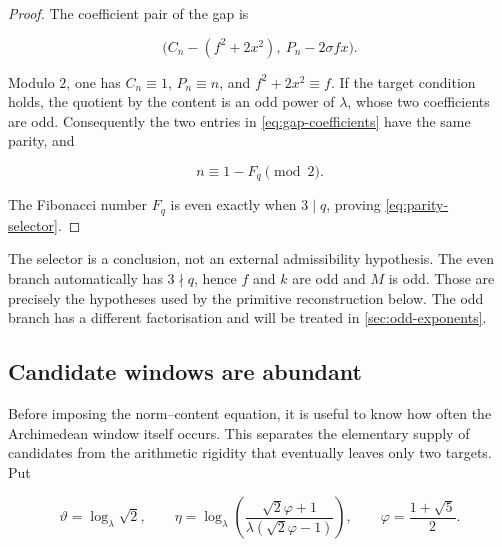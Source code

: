 \begin{proof}
The coefficient pair of the gap is

\begin{equation}
 \bigl(C_n-(f^2+2x^2),\ P_n-2\sigma fx\bigr).
 \label{eq:gap-coefficients}
\end{equation}

Modulo $2$, one has $C_n\equiv1$, $P_n\equiv n$, and
$f^2+2x^2\equiv f$. If the target condition holds, the quotient by the
content is an odd power of $\lambda$, whose two coefficients are odd.
Consequently the two entries in \cref{eq:gap-coefficients} have the same
parity, and

\begin{equation}
 n\equiv1-F_q\pmod2.
\end{equation}

The Fibonacci number $F_q$ is even exactly when $3\mid q$, proving
\cref{eq:parity-selector}.
\end{proof}

The selector is a conclusion, not an external admissibility hypothesis. The
even branch automatically has $3\nmid q$, hence $f$ and $k$ are odd and
$M$ is odd. Those are precisely the hypotheses used by the primitive
reconstruction below. The odd branch has a different factorisation and will
be treated in \cref{sec:odd-exponents}.

\subsection{Candidate windows are abundant}

Before imposing the norm--content equation, it is useful to know how often
the Archimedean window itself occurs. This separates the elementary supply
of candidates from the arithmetic rigidity that eventually leaves only two
targets. Put

\begin{equation}
 \vartheta=\log_\lambda\sqrt2,
 \qquad
 \eta=\log_\lambda\left(
  \frac{\sqrt2\varphi+1}{\lambda(\sqrt2\varphi-1)}
 \right),
 \qquad
 \varphi=\frac{1+\sqrt5}{2}.
 \label{eq:window-phases}
\end{equation}

